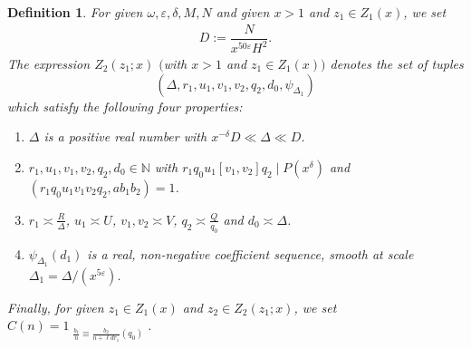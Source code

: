 \documentclass{amsart}
\newtheorem{defn}{Definition}
\numberwithin{equation}{section}
\begin{document}
\begin{defn}\label{def:Z2}
For  given $ \omega, \varepsilon, \delta, M, N$ and given $x>1$ and  $z_1 \in Z_1(x)$, we set 
\begin{align} \label{def:DII}
D :=  \dfrac{N}{x^{50\varepsilon}H^2}. 
\end{align}
The expression $Z_2(z_1;x)$ $($with $x>1$ and $z_1 \in Z_1(x))$ denotes the set of tuples $$(\Delta,r_1,u_1, v_1,v_2,q_2,d_0,\psi_{\Delta_1})$$ which satisfy the following four properties:
 \begin{enumerate}[{\rm (i)}]
 \item $\Delta$ is a positive real number with $x^{-\delta}D \ll \Delta \ll  D $. 
 \item   $r_1, u_1, v_1, v_2, q_2, d_0  \in \mathbb{N}$ with   $r_1q_0u_1[v_1,v_2]q_2 \mid P(x^\delta)$ and $(r_1q_0u_1v_1v_2q_2,ab_1b_2)=1$. 
 \item   $r_1 \asymp \frac{R}{\Delta}$, $u_1 \asymp U$,  $v_1,v_2 \asymp V$,  $q_2 \asymp \frac{Q}{q_0}$ and $d_0 \asymp \Delta$. 
 \item $\psi_{\Delta_1}(d_1)$ is a real, non-negative coefficient sequence, smooth at scale $\Delta_1=\Delta/(x^{5\varepsilon})$.
 \end{enumerate}
 
 \smallskip
 Finally, for given $z_1 \in Z_1(x)$ and $z_2 \in Z_2(z_1;x)$, we set  $C(n) = 1_{\substack{\frac{b_1}{n}  \equiv \frac{b_2}{n+\ell d r_1} (q_0)}}$. 
\end{defn}
\end{document}
